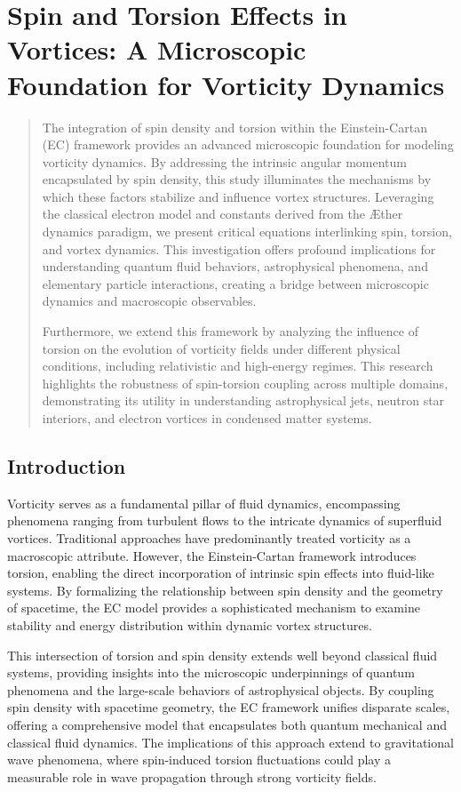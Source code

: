 
\section{Spin and Torsion Effects in Vortices: A Microscopic Foundation for Vorticity Dynamics}


\begin{abstract}
The integration of spin density and torsion within the Einstein-Cartan (EC) framework provides an advanced microscopic foundation for modeling vorticity dynamics. By addressing the intrinsic angular momentum encapsulated by spin density, this study illuminates the mechanisms by which these factors stabilize and influence vortex structures. Leveraging the classical electron model and constants derived from the \AE{}ther dynamics paradigm, we present critical equations interlinking spin, torsion, and vortex dynamics. This investigation offers profound implications for understanding quantum fluid behaviors, astrophysical phenomena, and elementary particle interactions, creating a bridge between microscopic dynamics and macroscopic observables.


Furthermore, we extend this framework by analyzing the influence of torsion on the evolution of vorticity fields under different physical conditions, including relativistic and high-energy regimes. This research highlights the robustness of spin-torsion coupling across multiple domains, demonstrating its utility in understanding astrophysical jets, neutron star interiors, and electron vortices in condensed matter systems.
\end{abstract}


\subsection*{Introduction}


Vorticity serves as a fundamental pillar of fluid dynamics, encompassing phenomena ranging from turbulent flows to the intricate dynamics of superfluid vortices. Traditional approaches have predominantly treated vorticity as a macroscopic attribute. However, the Einstein-Cartan framework introduces torsion, enabling the direct incorporation of intrinsic spin effects into fluid-like systems. By formalizing the relationship between spin density and the geometry of spacetime, the EC model provides a sophisticated mechanism to examine stability and energy distribution within dynamic vortex structures.


This intersection of torsion and spin density extends well beyond classical fluid systems, providing insights into the microscopic underpinnings of quantum phenomena and the large-scale behaviors of astrophysical objects. By coupling spin density with spacetime geometry, the EC framework unifies disparate scales, offering a comprehensive model that encapsulates both quantum mechanical and classical fluid dynamics. The implications of this approach extend to gravitational wave phenomena, where spin-induced torsion fluctuations could play a measurable role in wave propagation through strong vorticity fields.


